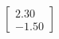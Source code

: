 \documentclass[preview]{standalone}
\begin{document}
\begin{align*}
\begin{bmatrix} 2.30 \\ -1.50 \end{bmatrix}
\end{align*}
\end{document}

